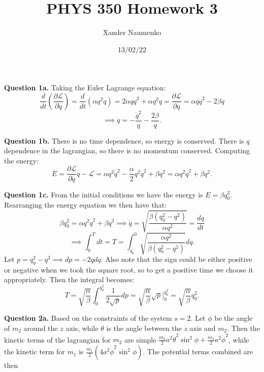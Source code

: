 \documentclass[letterpaper, reqno,11pt]{article}
\begin{document}
\title{PHYS 350 Homework 3}
\date{13/02/22}
\author{Xander Naumenko}
\maketitle

{\noindent\bf Question 1a.} Taking the Euler Lagrange equation: 
\[
\frac{d}{dt}\left( \frac{\partial\mathcal L}{\partial \dot q} \right)=\frac{d}{dt}\left( \alpha q^2\dot q\right)=2\alpha q\dot q^2+\alpha q^2\ddot q=\frac{\partial\mathcal L}{\partial q}=\alpha q\dot q^2-2\beta q
\]
\[
\implies\ddot q=-\frac{\dot q^2}{q}-\frac{2\beta}{q}
.\]

{\noindent\bf Question 1b.} There is no time dependence, so energy is conserved. There is $q$ dependence in the lagrangian, so there is no momentum conserved. Computing the energy: 
\[
E=\frac{\partial\mathcal L}{\partial \dot q}\dot q-\mathcal L=\alpha q^2\dot q^2-\frac{\alpha}{2}q^2\dot q^2+\beta q^2=\alpha q^2\dot q^2+\beta q^2
.\]

{\noindent\bf Question 1c.} From the initial conditions we have the energy is $E=\beta q_0^2$. Rearranging the energy equation we then have that: 
\[
\beta q_0^2=\alpha q^2\dot q^2+\beta q^2\implies \dot q=\sqrt{\frac{\beta\left( q_0^2-q^2 \right) }{\alpha q^2}}=\frac{dq}{dt}
\]
\[
\implies \int_0^T dt=T=\int_{q_0}^0 \sqrt{\frac{\alpha q^2}{\beta\left( q_0^2-q^2 \right) }} dq
.\]
Let $p=q_0^2-q^2\implies dp=-2qdq$. Also note that the sign could be either positive or negative when we took the square root, so to get a positive time we choose it appropriately. Then the integral becomes: 
\[
T=\sqrt{\frac{\alpha}{\beta}} \int_{0}^{q_0^2} \frac{1}{2\sqrt{p} }dp=\sqrt{\frac{\alpha}{\beta}}\sqrt{p} \bigg|_0^{q_0^2}=\sqrt{\frac{\alpha}{\beta}} q_0^2
.\]

{\noindent\bf Question 2a.} Based on the constraints of the system $s=2$. Let $\phi$ be the angle of $ m_2$ around the $z$ axis, while $\theta$ is the angle between the $z$ axis and $m_2$. Then the kinetic terms of the lagrangian for $m_2$ are simple $ \frac{m_2}{2}a^2\dot\theta ^2\sin^2\phi+\frac{m_2}{2}a^2\dot\phi^2 $, while the kinetic term for $m_1$ is $\frac{m_1}{2}\left( 4a^2\dot\phi^2\sin^2\phi \right) $. The potential terms combined are then $$
\end{document}
